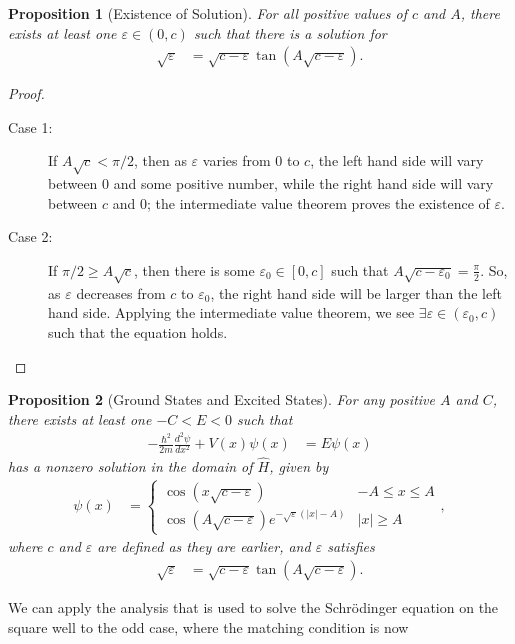 \documentclass[12pt]{extarticle}
\newcommand{\ve}{\varepsilon}
\theoremstyle{plain}
\newtheorem*{proposition}{Proposition}%
\theoremstyle{definition}
\theoremstyle{remark}
\begin{document}
  \begin{proposition}[Existence of Solution]
    For all positive values of $c$ and $A$, there exists at least one $\ve\in (0,c)$ such that there is a solution for 
    \begin{align*}
      \sqrt{\ve} &= \sqrt{c-\ve}\tan\left(A\sqrt{c-\ve}\right).
    \end{align*}
  \end{proposition}
  \begin{proof}
    \begin{description}
      \item[Case 1:] If $A\sqrt{c} < \pi/2$, then as $\ve$ varies from $0$ to $c$, the left hand side will vary between $0$ and some positive number, while the right hand side will vary between $c$ and $0$; the intermediate value theorem proves the existence of $\ve$.
      \item[Case 2:] If $\pi/2\geq A\sqrt{c}$, then there is some $\ve_{0}\in [0,c]$ such that $A\sqrt{c-\ve_0} = \frac{\pi}{2}$. So, as $\ve$ decreases from $c$ to $\ve_0$, the right hand side will be larger than the left hand side. Applying the intermediate value theorem, we see $\exists \ve\in (\ve_0,c)$ such that the equation holds.
    \end{description}
  \end{proof}
  \begin{proposition}[Ground States and Excited States]
    For any positive $A$ and $C$, there exists at least one $-C < E < 0$ such that
    \begin{align*}
      -\frac{\hbar^2}{2m}\frac{d ^2\psi}{d x^2} + V(x)\psi(x) &= E\psi(x)
    \end{align*}
    has a nonzero solution in the domain of $\hat{H}$, given by
    \begin{align*}
      \psi(x) &= \begin{cases}
        \cos\left(x\sqrt{c-\ve}\right) & -A \leq x \leq A\\
        \cos\left(A\sqrt{c-\ve}\right)e^{-\sqrt{\ve}\left(|x|-A\right)} & |x|\geq A
      \end{cases},
    \end{align*}
    where $c$ and $\ve$ are defined as they are earlier, and $\ve$ satisfies
    \begin{align*}
      \sqrt{\ve} &= \sqrt{c-\ve} \tan\left(A\sqrt{c-\ve}\right).
    \end{align*}
  \end{proposition}
  We can apply the analysis that is used to solve the Schrödinger equation on the square well to the odd case, where the matching condition is now
\end{document}

